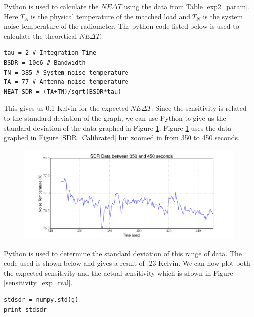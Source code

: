 Python is used to calculate the $NE\Delta T$ using the data from Table \ref{exp2_param}.  Here $T_A$ is the physical temperature of the matched load and $T_N$ is the system noise temperature of the radiometer.  The python code listed below is used to calculate the theoretical $NE\Delta T$.

\begin{lstlisting}[frame=single,keywordstyle=\color{blue}]
tau = 2 # Integration Time
BSDR = 10e6 # Bandwidth
TN = 385 # System noise temperature
TA = 77 # Antenna noise temperature
NEAT_SDR = (TA+TN)/sqrt(BSDR*tau)
\end{lstlisting}

This gives us 0.1 Kelvin for the expected $NE\Delta T$.  Since the sensitivity is related to the standard deviation of the graph, we can use Python to give us the standard deviation of the data graphed in Figure \ref{Sensitivity_graph}.  Figure \ref{Sensitivity_graph} uses the data graphed in Figure \ref{SDR_Calibrated} but zoomed in from 350 to 450 seconds. 

\begin{figure}[h!tb] \centering
\includegraphics[width=\textwidth]{Experiments/Exp1/SDR_Zoom.pdf}
\label{Sensitivity_graph}
\end{figure}

Python is used to determine the standard deviation of this range of data.  The code used is shown below and gives a result of .23 Kelvin.  We can now plot both the expected sensitivity and the actual sensitivity which is shown in Figure \ref{sensitivity_exp_real}.

\begin{lstlisting}[frame=single,keywordstyle=\color{blue}]
stdsdr = numpy.std(g)
print stdsdr
\end{lstlisting}

